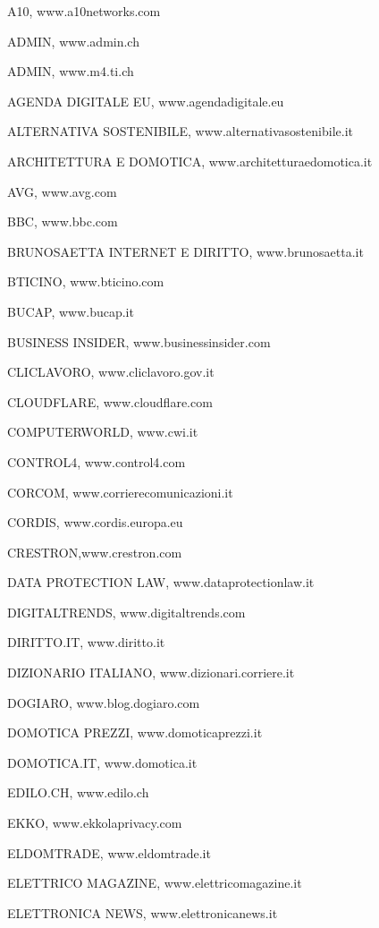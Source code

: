 

\noindent A10, www.a10networks.com

\noindent ADMIN, www.admin.ch 

\noindent ADMIN, www.m4.ti.ch

\noindent AGENDA DIGITALE EU, www.agendadigitale.eu 

\noindent ALTERNATIVA SOSTENIBILE, www.alternativasostenibile.it

\noindent ARCHITETTURA E DOMOTICA, www.architetturaedomotica.it

\noindent AVG, www.avg.com 

\noindent BBC, www.bbc.com 

\noindent BRUNOSAETTA INTERNET E DIRITTO, www.brunosaetta.it 

\noindent BTICINO, www.bticino.com 

\noindent BUCAP, www.bucap.it 

\noindent BUSINESS INSIDER, www.businessinsider.com 

\noindent CLICLAVORO, www.cliclavoro.gov.it

\noindent CLOUDFLARE, www.cloudflare.com 

\noindent COMPUTERWORLD, www.cwi.it 

\noindent CONTROL4, www.control4.com

\noindent CORCOM, www.corrierecomunicazioni.it 

\noindent CORDIS, www.cordis.europa.eu 

\noindent CRESTRON,www.crestron.com

\noindent DATA PROTECTION LAW, www.dataprotectionlaw.it 

\noindent DIGITALTRENDS, www.digitaltrends.com 

\noindent DIRITTO.IT, www.diritto.it 

\noindent DIZIONARIO ITALIANO, www.dizionari.corriere.it 

\noindent DOGIARO, www.blog.dogiaro.com 

\noindent DOMOTICA PREZZI, www.domoticaprezzi.it

\noindent DOMOTICA.IT, www.domotica.it

\noindent EDILO.CH, www.edilo.ch 

\noindent EKKO, www.ekkolaprivacy.com 

\noindent ELDOMTRADE, www.eldomtrade.it 

\noindent ELETTRICO MAGAZINE, www.elettricomagazine.it 

\noindent ELETTRONICA NEWS, www.elettronicanews.it 

